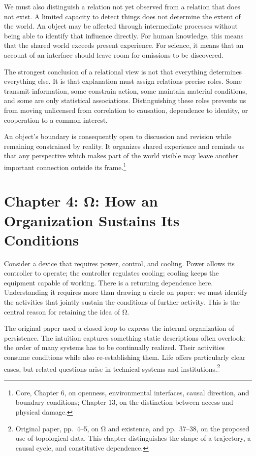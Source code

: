 \documentclass[
  english,
  11pt,
  oneside]{book}
\begin{document}
We must also distinguish a relation not yet observed from a relation that does not exist. A limited capacity to detect things does not determine the extent of the world. An object may be affected through intermediate processes without being able to identify that influence directly. For human knowledge, this means that the shared world exceeds present experience. For science, it means that an account of an interface should leave room for omissions to be discovered.

The strongest conclusion of a relational view is not that everything determines everything else. It is that explanation must assign relations precise roles. Some transmit information, some constrain action, some maintain material conditions, and some are only statistical associations. Distinguishing these roles prevents us from moving unlicensed from correlation to causation, dependence to identity, or cooperation to a common interest.

\begingroup{}

An object's boundary is consequently open to discussion and revision while remaining constrained by reality. It organizes shared experience and reminds us that any perspective which makes part of the world visible may leave another important connection outside its frame.\footnote{\hypertarget{ph-note-9}{}Core, Chapter 6, on openness, environmental interfaces, causal direction, and boundary conditions; Chapter 13, on the distinction between access and physical damage.}

\par\endgroup

\chapter{Chapter 4: Ω: How an Organization Sustains Its Conditions}\label{ph-ch-04}

Consider a device that requires power, control, and cooling. Power allows its controller to operate; the controller regulates cooling; cooling keeps the equipment capable of working. There is a returning dependence here. Understanding it requires more than drawing a circle on paper: we must identify the activities that jointly sustain the conditions of further activity. This is the central reason for retaining the idea of Ω.

The original paper used a closed loop to express the internal organization of persistence. The intuition captures something static descriptions often overlook: the order of many systems has to be continually realized. Their activities consume conditions while also re-establishing them. Life offers particularly clear cases, but related questions arise in technical systems and institutions.\footnote{\hypertarget{ph-note-10}{}Original paper, pp.~4--5, on Ω and existence, and pp.~37--38, on the proposed use of topological data. This chapter distinguishes the shape of a trajectory, a causal cycle, and constitutive dependence.}
\end{document}
